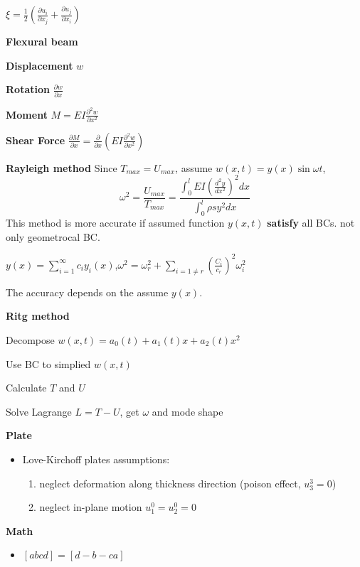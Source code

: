 \documentclass{article}
\begin{document}
\begin{multicols*}{3}
  $\xi=\frac{1}{2}(\frac{\partial u_{i}}{\partial x_{j}}+\frac{\partial u_{j}}{\partial x_{i}})$
  
  \textbf{Flexural beam}

  \textbf{Displacement} $w$

  \textbf{Rotation} $\frac{\partial w}{\partial x}$

  \textbf{Moment} $M=EI\frac{\partial^{2} w}{\partial x^{2}}$

  \textbf{Shear Force} $\frac{\partial M}{\partial x}=\frac{\partial }{\partial x}(EI \frac{\partial^{2}w}{\partial x^{2}})$


 
  \noindent\textbf{Rayleigh method} Since $T_{max} = U_{max}$, assume $w(x,t) = y(x) \sin\omega t$,
      \begin{equation*}
        \omega^2 =\frac{U_{max}}{T_{max}}=\frac{\int_0^l EI(\frac{d^2y}{dx^2})^2 dx}{\int_0^l \rho s y^2 dx}
      \end{equation*}
      This method is more accurate if assumed function $y(x,t)$ \textbf{satisfy} all BCs. not only geometrocal BC.
    
      $y(x)=\sum_{i=1}^{\infty}c_{i}y_{i}(x)$,$\omega^{2}=\omega_{r}^{2}+\sum_{i=1 \neq r}(\frac{C_{i}}{c_{r}})^{2}\omega_{i}^{2}$

      The accuracy depends on the assume $y(x)$.

  \noindent\textbf{Ritg method}

 Decompose $w(x,t) = a_0(t) + a_1(t)x + a_2(t)x^2$

Use BC to simplied $w(x,t)$

 Calculate $T$ and $U$

 Solve Lagrange $L = T - U$, get $\omega$ and mode shape


  \noindent\textbf{Plate}
  \begin{itemize}
  \item Love-Kirchoff plates assumptions:
    \begin{enumerate}
    \item neglect deformation along thickness direction (poison effect, $u_3^3=0$)
    \item neglect in-plane motion $u_1^0=u_2^0=0$
    \end{enumerate}
  \end{itemize}

  \noindent\textbf{Math}
  \begin{itemize}
  \item $[a b c d] = [d -b -c a]$
  \end{itemize}




\end{multicols*}
\end{document}
